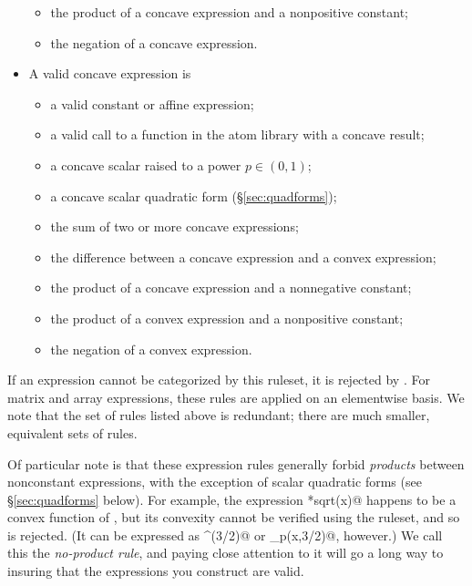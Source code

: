 \documentclass[12pt]{article}
\begin{document}
\begin{itemize}
\begin{itemize}
\item the product of a concave expression and a nonpositive constant;
\item the negation of a concave expression.
\end{itemize}
\item A valid concave expression is
\begin{itemize}
\item a valid constant or affine expression;
\item a valid call to a function in the atom library with a concave result;
\item a concave scalar raised to a power $p\in(0,1)$;
\item a concave scalar quadratic form (\S\ref{sec:quadforms});
\item the sum of two or more concave expressions;
\item the difference between a concave expression and a convex expression;
\item the product of a concave expression and a nonnegative constant; 
\item the product of a convex expression and a nonpositive constant;
\item the negation of a convex expression.
\end{itemize}
\end{itemize}
If an expression cannot be categorized by this ruleset,
it is rejected by \cvx.
For matrix and array expressions, these rules
are applied on an elementwise basis.
We note that the set of rules listed above is redundant;
there are much smaller, equivalent sets of rules.

Of particular note is that these expression rules generally 
forbid \emph{products}
between nonconstant expressions,  
with the exception of scalar quadratic forms 
(see \S\ref{sec:quadforms} below). 
For example, the expression \verb@x*sqrt(x)@ happens to be a 
convex function of \verb@x@, but its convexity cannot be verified
using the \cvx ruleset, and so is rejected.
(It can be expressed as \verb@x^(3/2)@ or \verb@pow_p(x,3/2)@, however.)
We call this the \emph{no-product rule},
and paying close attention to it will go a long way to insuring that the
expressions you construct are valid.

\end{document}
